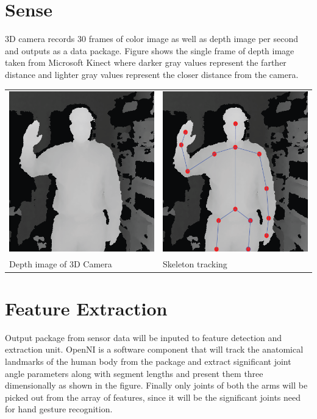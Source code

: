 \section{Sense} 
3D camera records 30 frames of color image as well as depth image per second and outputs as a data package. Figure shows the single frame of depth image taken from Microsoft Kinect where darker gray values represent the farther distance and lighter gray values represent the closer distance from the camera.

\begin{table}
	[h] \centering 
	\begin{tabular}
		{ll} 
		\includegraphics[height=7cm]{figures/depth.png} & 
		\includegraphics[height=7cm]{figures/depth-skeleton.png} \\
		Depth image of 3D Camera & Skeleton tracking 
	\end{tabular}
\end{table}

\section{Feature Extraction}
Output package from sensor data will be inputed to feature detection and extraction unit. OpenNI is a software component that will track the anatomical landmarks of the human body from the package and extract significant joint angle parameters along with segment lengths and present them three dimensionally as shown in the figure. Finally only joints of both the arms will be picked out from the array of features, since it will be the significant joints need for hand gesture recognition.

